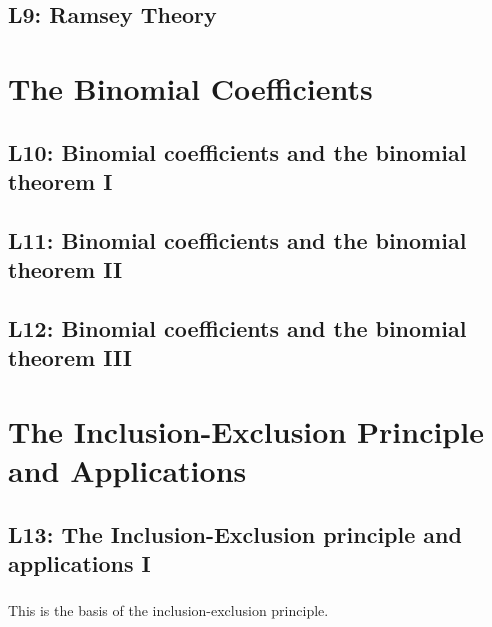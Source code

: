 \documentclass{report}
\begin{document}
\section{L9: Ramsey Theory}

\setcounter{chapter}{4}

\chapter{The Binomial Coefficients}

\section{L10: Binomial coefficients and the binomial theorem I}

\section{L11: Binomial coefficients and the binomial theorem II}

\section{L12: Binomial coefficients and the binomial theorem III}

\chapter{The Inclusion-Exclusion Principle and Applications}

\section{L13: The Inclusion-Exclusion principle and applications I}


\subsection*{}
This is the basis of the inclusion-exclusion principle.
\end{document}
